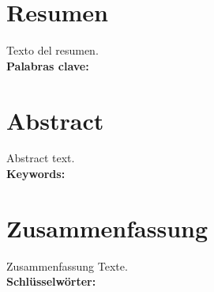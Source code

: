 \newpage
\thispagestyle{empty}
\chapter*{\sffamily Resumen}
%
\begin{center}
\textbf{\large \thesisname}
\end{center}
\par Texto del resumen.
\\[2cm]
\textbf{Palabras clave:} \palabrasclave

\newpage
\thispagestyle{empty}
\chapter*{\sffamily Abstract}
%
\begin{center}
\textbf{\large \thesisnameeng}
\end{center}
\par Abstract text.
\\[2cm]
\textbf{Keywords:} \keywords

\newpage 
\thispagestyle{empty}
\chapter*{\sffamily Zusammenfassung}
%
\begin{center}
\textbf{\large \thesisnamelang}
\end{center}
\par Zusammenfassung Texte.
\\[2cm]
\textbf{Schlüsselwörter:} \schlusselworter